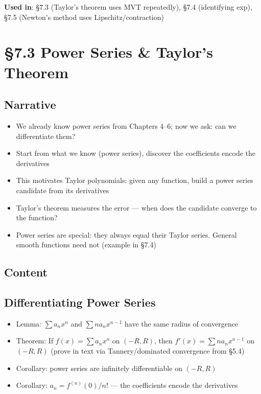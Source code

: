 \documentclass[
  10pt,
  letterpaper,
]{scrbook}
\providecommand{\tightlist}{%
  \setlength{\itemsep}{0pt}\setlength{\parskip}{0pt}}
\begin{document}
\textbf{Used in}: §7.3 (Taylor's theorem uses MVT repeatedly), §7.4
(identifying exp), §7.5 (Newton's method uses Lipschitz/contraction)

\section{§7.3 Power Series \& Taylor's
Theorem}\label{power-series-taylors-theorem}

\subsection{Narrative}\label{narrative-31}

\begin{itemize}
\tightlist
\item
  We already know power series from Chapters 4--6; now we ask: can we
  differentiate them?
\item
  Start from what we know (power series), discover the coefficients
  encode the derivatives
\item
  This motivates Taylor polynomials: given any function, build a power
  series candidate from its derivatives
\item
  Taylor's theorem measures the error --- when does the candidate
  converge to the function?
\item
  Power series are special: they always equal their Taylor series.
  General smooth functions need not (example in §7.4)
\end{itemize}

\subsection{Content}\label{content-31}

\subsection{Differentiating Power
Series}\label{differentiating-power-series}

\begin{itemize}
\tightlist
\item
  Lemma: \(\sum a_n x^n\) and \(\sum n a_n x^{n-1}\) have the same
  radius of convergence
\item
  Theorem: If \(f(x) = \sum a_n x^n\) on \((-R, R)\), then
  \(f'(x) = \sum n a_n x^{n-1}\) on \((-R, R)\) (prove in text via
  Tannery/dominated convergence from §5.4)
\item
  Corollary: power series are infinitely differentiable on \((-R, R)\)
\item
  Corollary: \(a_n = f^{(n)}(0)/n!\) --- the coefficients encode the
  derivatives
\end{itemize}
\end{document}

